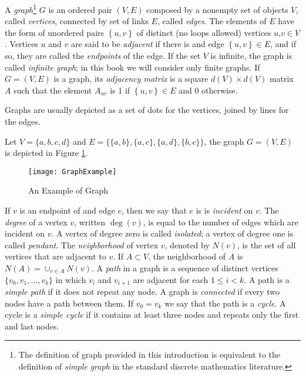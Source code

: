 A \emph{graph}\footnote{The definition of graph provided in this introduction is equivalent to the definition of \emph{simple graph} in the standard discrete mathematics literature.} $G$ is an ordered pair $(V,E)$ composed by a nonempty set of objects $V$, called \emph{vertices}, connected by set of links $E$, called \emph{edges}. The elements of $E$ have the form of unordered pairs $\left\{ u,v\right\}$ of distinct (no loops allowed) vertices $u$,$v\in V$. Vertices $u$ and $v$ are said to be \emph{adjacent} if there is and edge $\left\{ u,v\right\} \in E$, and if so, they are called the \emph{endpoints} of the edge. If the set $V$ is infinite, the graph is called \emph{infinite graph}; in this book we will consider only finite graphs. If $G = (V,E)$ is a graph, its \emph{adjacency matrix} is a square $d(V) \times d(V)$ matrix $A$ such that the element $A_{uv}$ is 1 if $\left\{ u,v\right\} \in E$ and 0 otherwise.

Graphs are usually depicted as a set of dots for the vertices, joined by lines for the edges.

\begin{example}
\label{ex:binary_tree}
Let $V=\{a, b, c, d\}$ and $E=\{ \{a,b\}, \{a,c\}, \{a,d\}, \{b,c\} \}$, the graph $G=(V,E)$ is depicted in Figure \ref{fig:Graph-Example}.
\end{example}

\begin{figure}[h]
\centering\texttt{[image: GraphExample]}
\caption{\label{fig:Graph-Example}An Example of Graph}
\end{figure}

If $v$ is an endpoint of and edge $e$, then we say that $e$ is is \emph{incident} on $v$. The \emph{degree} of a vertex $v$, written $\deg(v)$, is equal to the number of edges which are incident on $v$. A vertex of degree zero is called \emph{isolated}; a vertex of degree one is called \emph{pendant}. The \emph{neighborhood} of vertex $v$, denoted by $N(v)$, is the set of all vertices that are adjacent to $v$. If $A \subset V$, the neighborhood of $A$ is $N(A) = \cup_{v \in A} N(v)$. A \emph{path} in a graph is a sequence of distinct vertices $\{v_{0}, v_{1}, \ldots ,v_{k}\}$ in which $v_{i}$ and $v_{i+1}$ are adjacent for each $1 \leq i < k$. A path is a \emph{simple path} if it does not repeat any node. A graph is \emph{connected} if every two nodes have a path between them. If $v_{0} = v_{k}$ we say that the path is a \emph{cycle}. A cycle is a \emph{simple cycle} if it contains at least three nodes and repeats only the first and last nodes. 

